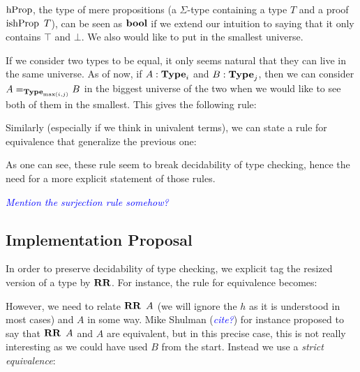 \documentclass[11pt]{article}
\theoremstyle{plain}
\theoremstyle{remark}
\newcommand\meta[1]{\noindent\textcolor{blue}{\emph{#1}}}
\begin{document}
$\operatorname{hProp}$, the type of mere propositions (a $\Sigma$-type containing a type $T$
and a proof $\operatorname{ishProp}\ T$), can be seen as $\operatorname{\mathbf{bool}}$ if we extend our intuition
to saying that it only contains $\top$ and $\bot$. We also would like to put in
the smallest universe.

\begin{mathc}
\end{mathc}

If we consider two types to be equal, it only seems natural that they can live
in the same universe. As of now, if $A : \operatorname{\mathbf{Type}}_i$ and $B : \operatorname{\mathbf{Type}}_j$, then we
can consider $A =_{\operatorname{\mathbf{Type}}_{\max(i,j)}} B$ in the biggest universe of the two
when we would like to see both of them in the smallest.
This gives the following rule:

\begin{mathc}
\end{mathc}

Similarly (especially if we think in univalent terms), we can state a rule for
equivalence that generalize the previous one:

\begin{mathc}
\end{mathc}

As one can see, these rule seem to break decidability of type checking, hence
the need for a more explicit statement of those rules.

\meta{Mention the surjection rule somehow?}

\subsection{Implementation Proposal}

In order to preserve decidability of type checking, we explicit tag the resized
version of a type by $\operatorname{\mathbf{RR}}$. For instance, the rule for equivalence becomes:

\begin{mathc}
\end{mathc}

\noindent
However, we need to relate $\operatorname{\mathbf{RR}}\ A$ (we will ignore the $h$ as it is understood
in most cases) and $A$ in some way. Mike Shulman (\meta{cite?}) for instance
proposed to say that $\operatorname{\mathbf{RR}}\ A$ and $A$ are equivalent, but in this precise case,
this is not really interesting as we could have used $B$ from the start.
Instead we use a \emph{strict equivalence}:
\end{document}
